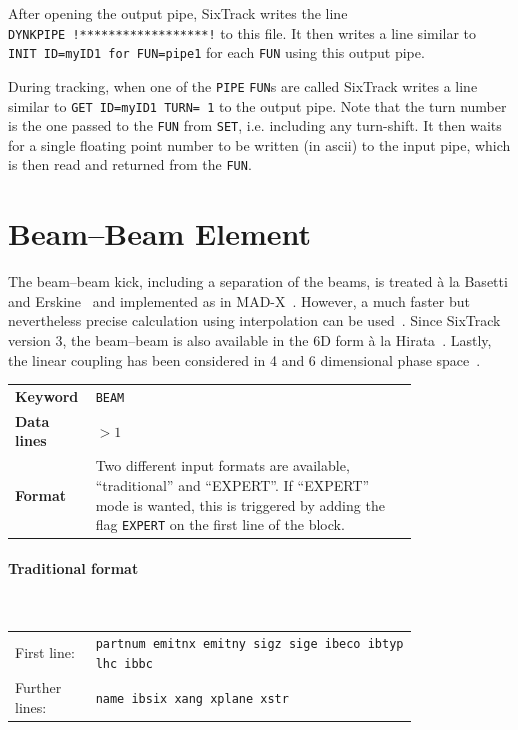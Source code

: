 After opening the output pipe, SixTrack writes the line \texttt{DYNKPIPE~!******************!} to this file.
It then writes a line similar to \texttt{INIT~ID=myID1~for~FUN=pipe1} for each \texttt{FUN} using this output pipe.

During tracking, when one of the \texttt{PIPE} \texttt{FUN}s are called SixTrack writes a line similar to \texttt{GET ID=myID1 TURN=~1} to the output pipe.
Note that the turn number is the one passed to the \texttt{FUN} from \texttt{SET}, i.e. including any turn-shift.
It then waits for a single floating point number to be written (in ascii) to the input pipe, which is then read and returned from the \texttt{FUN}.

\section{Beam--Beam Element} \label{BeamBeam}

The beam--beam kick, including a separation of the beams, is treated \`{a} la Basetti and Erskine~\cite{BasErs} and implemented as in MAD-X~\cite{MAD}.
However, a much faster but nevertheless precise calculation using interpolation can be used~\cite{ERIC}.
Since SixTrack version 3, the beam--beam is also available in the 6D form \`{a} la Hirata~\cite{Hirata}.
Lastly, the linear coupling has been considered in 4 and 6 dimensional phase space~\cite{ripbeam}.

\bigskip
\begin{tabular}{@{}lp{0.8\linewidth}}
    \textbf{Keyword}    & \texttt{BEAM}\index{BEAM} \\
    \textbf{Data lines} & $>1$ \\
    \textbf{Format}     & Two different input formats are available, ``traditional'' and ``EXPERT''. If ``EXPERT'' mode is wanted, this is triggered by adding the flag \texttt{EXPERT}\index{BEAM EXPERT} on the first line of the block.
\end{tabular}

\paragraph{Traditional format}~\\

\bigskip
\begin{tabular}{@{}lp{0.8\linewidth}}
    First line:    & \texttt{partnum emitnx emitny sigz sige ibeco ibtyp lhc ibbc} \\
    Further lines: & \texttt{name ibsix xang xplane xstr}
\end{tabular}

